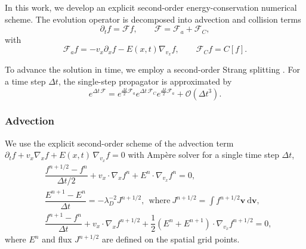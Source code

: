 \documentclass[preprint,1p,times]{elsarticle}
\theoremstyle{definition}
\theoremstyle{remark}
\begin{document}
In this work, we develop an explicit second-order energy-conservation numerical scheme.
The evolution operator is decomposed into advection and collision terms
\begin{equation}
    \partial_{t} f = \mathcal{F}f, \qquad \mathcal{F} = \mathcal{F}_{a} + \mathcal{F}_{C},
\end{equation}
with
\begin{equation}
    \mathcal{F}_{a}f = -v_{x}\partial_{x}f -E(x,t)\nabla_{v_{x}}f, \qquad \mathcal{F}_{C}f = C[f].
\end{equation}

To advance the solution in time, we employ a second-order Strang splitting
\cite{strang1968construction}. 
For a time step $\Delta t$, the single-step propagator is approximated by
\begin{equation}
    e^{\Delta t\,\mathcal{F}} = e^{\frac{\Delta t}{2}\mathcal{F}_{a}} e^{\Delta t\,\mathcal{F}_{C}} e^{\frac{\Delta t}{2}\mathcal{F}_{a}} + \mathcal{O}(\Delta t^{3}).
\end{equation}



\subsubsection{Advection}
We use the explicit second-order scheme \cite{cheng2014energy} of the advection term $\partial_{t} f + v_{x} \nabla_{x} f + E(x,t)\,\nabla_{v_{x}} f = 0$ with Amp\`ere solver  for a single time step $\Delta t$,
\begin{equation}\label{eq:VAadv}
\begin{aligned}
    &\dfrac{f^{n+1/2} - f^{n}}{\Delta t / 2} + v_{x} \cdot \nabla_{x} f^{n} + E^{n} \cdot \nabla_{v_{x}} f^{n} = 0 , \\
    &\dfrac{E^{n+1}-E^{n}}{\Delta t} = - \lambda_{D}^{-2} J^{n+1/2}, ~~ \text{where} ~ J^{n+1/2} = \int f^{n+1/2} \bm{v} ~ \mathrm{d}\bm{v} , \\
    &\dfrac{f^{n+1}-f^{n}}{\Delta t} + v_{x} \cdot \nabla_{x} f^{n+1/2} + \dfrac{1}{2} (E^{n}+E^{n+1}) \cdot \nabla_{v_{x}} f^{n+1/2} = 0 ,
\end{aligned}
\end{equation}
where $E^{n}$ and flux $J^{n+1/2}$ are defined on the spatial grid points.
\end{document}
